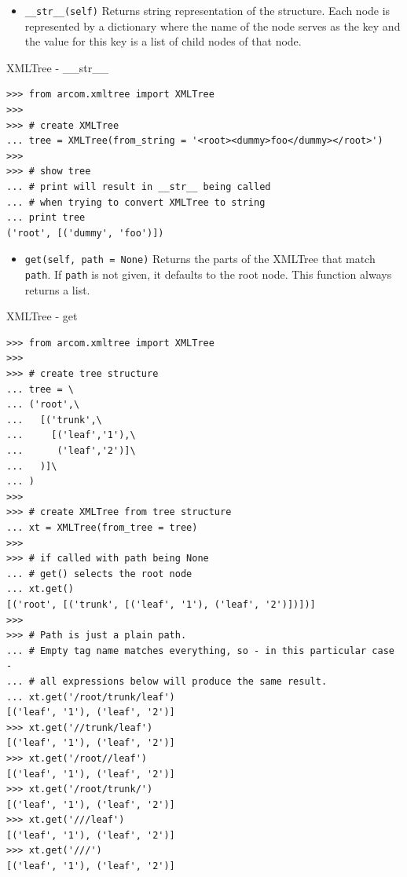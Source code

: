 \documentclass{article}
\begin{document}
\begin{flushleft}
\begin{itemize}
{    \begin{itemize}
      \item{ \verb$__str__(self)$ \linebreak
      Returns string representation of the structure. Each node is represented by a dictionary where the name
      of the node serves as the key and the value for this key is a list of child nodes of that node.
      }
    \end{itemize}

    \begin{example}
      \caption{XMLTree - \_\_str\_\_}\label{xtstr}
\begin{verbatim}
>>> from arcom.xmltree import XMLTree
>>> 
>>> # create XMLTree
... tree = XMLTree(from_string = '<root><dummy>foo</dummy></root>')
>>> 
>>> # show tree
... # print will result in __str__ being called
... # when trying to convert XMLTree to string
... print tree
('root', [('dummy', 'foo')])
\end{verbatim}
    \end{example}

    \begin{itemize}
      \item{ \verb$get(self, path = None)$ \linebreak
      Returns the parts of the XMLTree that match \verb$path$.
      If \verb$path$ is not given, it defaults to the root node.
      This function always returns a list.
      }
    \end{itemize}

    \begin{example}
      \caption{XMLTree - get}\label{xtget}
\begin{verbatim}
>>> from arcom.xmltree import XMLTree
>>> 
>>> # create tree structure
... tree = \
... ('root',\
...   [('trunk',\
...     [('leaf','1'),\
...      ('leaf','2')]\
...   )]\
... )
>>> 
>>> # create XMLTree from tree structure
... xt = XMLTree(from_tree = tree)
>>> 
>>> # if called with path being None
... # get() selects the root node
... xt.get()
[('root', [('trunk', [('leaf', '1'), ('leaf', '2')])])]
>>> 
>>> # Path is just a plain path.
... # Empty tag name matches everything, so - in this particular case -
... # all expressions below will produce the same result.
... xt.get('/root/trunk/leaf')
[('leaf', '1'), ('leaf', '2')]
>>> xt.get('//trunk/leaf')
[('leaf', '1'), ('leaf', '2')]
>>> xt.get('/root//leaf')
[('leaf', '1'), ('leaf', '2')]
>>> xt.get('/root/trunk/')
[('leaf', '1'), ('leaf', '2')]
>>> xt.get('///leaf')
[('leaf', '1'), ('leaf', '2')]
>>> xt.get('///')
[('leaf', '1'), ('leaf', '2')]
\end{verbatim}
    \end{example}

}
\end{itemize}
\end{flushleft}
\end{document}
